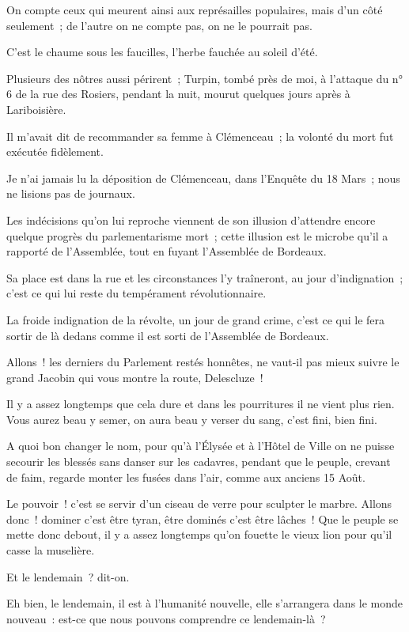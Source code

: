 \documentclass[french,twoside]{book} %
\begin{document}
On compte ceux qui meurent ainsi aux représailles populaires, mais d’un côté seulement ; de l’autre on ne compte pas, on ne le pourrait pas.\par
C’est le chaume sous les faucilles, l’herbe fauchée au soleil d’été.\par
Plusieurs des nôtres aussi périrent ; Turpin, tombé près de moi, à l’attaque du n° 6 de la rue des Rosiers, pendant la nuit, mourut quelques jours après à Lariboisière.\par
Il m’avait dit de recommander sa femme à Clémenceau ; la volonté du mort fut exécutée fidèlement.\par
Je n’ai jamais lu la déposition de Clémenceau, dans l’Enquête du 18 Mars ; nous ne lisions pas de journaux.\par
Les indécisions qu’on lui reproche viennent de son illusion d’attendre encore quelque progrès du parlementarisme mort ; cette illusion est le microbe qu’il a rapporté de l’Assemblée, tout en fuyant l’Assemblée de Bordeaux.\par
Sa place est dans la rue et les circonstances l’y traîneront, au jour d’indignation ; c’est ce qui lui reste du tempérament révolutionnaire.\par
La froide indignation de la révolte, un jour  de grand crime, c’est ce qui le fera sortir de là dedans comme il est sorti de l’Assemblée de Bordeaux.\par
Allons ! les derniers du Parlement restés honnêtes, ne vaut-il pas mieux suivre le grand Jacobin qui vous montre la route, Delescluze !\par
Il y a assez longtemps que cela dure et dans les pourritures il ne vient plus rien. Vous aurez beau y semer, on aura beau y verser du sang, c’est fini, bien fini.\par
A quoi bon changer le nom, pour qu’à l’Élysée et à l’Hôtel de Ville on ne puisse secourir les blessés sans danser sur les cadavres, pendant que le peuple, crevant de faim, regarde monter les fusées dans l’air, comme aux anciens 15 Août.\par
Le pouvoir ! c’est se servir d’un ciseau de verre pour sculpter le marbre. Allons donc ! dominer c’est être tyran, être dominés c’est être lâches ! Que le peuple se mette donc debout, il y a assez longtemps qu’on fouette le vieux lion pour qu’il casse la muselière.\par
Et le lendemain ? dit-on.\par
Eh bien, le lendemain, il est à l’humanité nouvelle, elle s’arrangera dans le monde nouveau : est-ce que nous pouvons comprendre ce lendemain-là ?\par
\end{document}
